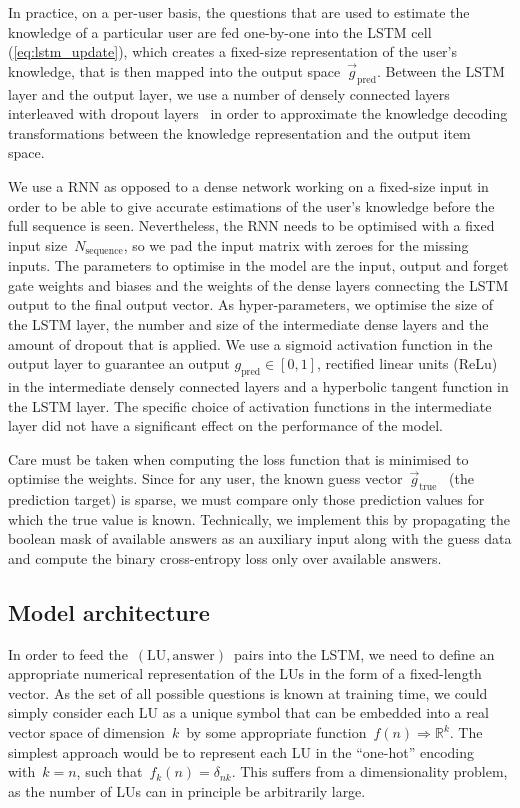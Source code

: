 In practice, on a per-user basis, the questions that are used to estimate the knowledge of a particular user are fed one-by-one into the LSTM cell (\cref{eq:lstm_update}), which creates a fixed-size representation of the user's knowledge, that is then mapped into the output space~$\vec{g}_\mathrm{pred}$. Between the LSTM layer and the output layer, we use a number of densely connected layers interleaved with dropout layers~\cite{srivastava2014dropout} in order to approximate the knowledge decoding transformations between the knowledge representation and the output item space.

We use a RNN as opposed to a dense network working on a fixed-size input in order to be able to give accurate estimations of the user's knowledge before the full sequence is seen. Nevertheless, the RNN needs to be optimised with a fixed input size~$N_{\mathrm{sequence}}$, so we pad the input matrix with zeroes for the missing inputs. The parameters to optimise in the model are the input, output and forget gate weights and biases and the weights of the dense layers connecting the LSTM output to the final output vector. As hyper-parameters, we optimise the size of the LSTM layer, the number and size of the intermediate dense layers and the amount of dropout that is applied. We use a sigmoid activation function in the output layer to guarantee an output $g_{\mathrm{pred}} \in [0,1]$, rectified linear units (ReLu) in the intermediate densely connected layers and a hyperbolic tangent function in the LSTM layer. The specific choice of activation functions in the intermediate layer did not have a significant effect on the performance of the model. 

Care must be taken when computing the loss function that is minimised to optimise the weights. Since for any user, the known guess vector~$\vec{g}_\mathrm{true}$~ (the prediction target) is sparse, we must compare only those prediction values for which the true value is known. Technically, we implement this by propagating the boolean mask of available answers as an auxiliary input along with the guess data and compute the binary cross-entropy loss only over available answers.

\subsection{Model architecture}
\label{sec:nlp_model_architecture}
In order to feed the~$(\mathrm{LU}, \mathrm{answer})$~pairs into the LSTM, we need to define an appropriate numerical representation of the LUs in the form of a fixed-length vector. As the set of all possible questions is known at training time, we could simply consider each LU as a unique symbol that can be embedded into a real vector space of dimension~$k$~by some appropriate function~$f(n) \Rightarrow \mathbb{R}^k$. The simplest approach would be to represent each LU in the ``one-hot'' encoding with~$k=n$, such that~$f_k(n) = \delta_{nk}$. This suffers from a dimensionality problem, as the number of LUs can in principle be arbitrarily large.

